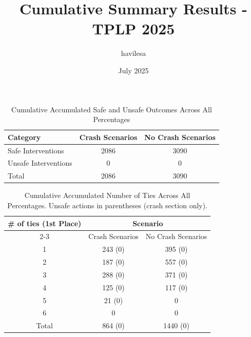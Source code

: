 \documentclass{article}
\title{Cumulative Summary Results - TPLP 2025}
\author{havilesa}
\date{July 2025}
\begin{document}
\maketitle

\begin{table}[h]
\centering
\caption{Cumulative Accumulated Safe and Unsafe Outcomes Across All Percentages}
\begin{tabular}{l|cc}
\toprule
Category & Crash Scenarios & No Crash Scenarios \\
\midrule
Safe Interventions & 2086 & 3090 \\ 
Unsafe Interventions & 0 & 0 \\ 
\midrule
Total & 2086 & 3090 \\ 
\bottomrule
\end{tabular}
\end{table}

\begin{table}[h]
\centering
\caption{Cumulative Accumulated Number of Ties Across All Percentages.
Unsafe actions in parentheses (crash section only).}
\begin{tabular}{c|cc}
\toprule
\multirow{2}{*}{\# of ties (1st Place)} & \multicolumn{2}{c|}{Scenario} \\
\cmidrule{2-3}
 & Crash Scenarios & No Crash Scenarios \\
\midrule
1 & 243 (0) & 395 (0) \\ 
2 & 187 (0) & 557 (0) \\ 
3 & 288 (0) & 371 (0) \\ 
4 & 125 (0) & 117 (0) \\ 
5 & 21 (0) & 0 \\ 
6 & 0 & 0 \\ 
\midrule
Total & 864 (0) & 1440 (0) \\ 
\bottomrule
\end{tabular}
\end{table}
\end{document}
